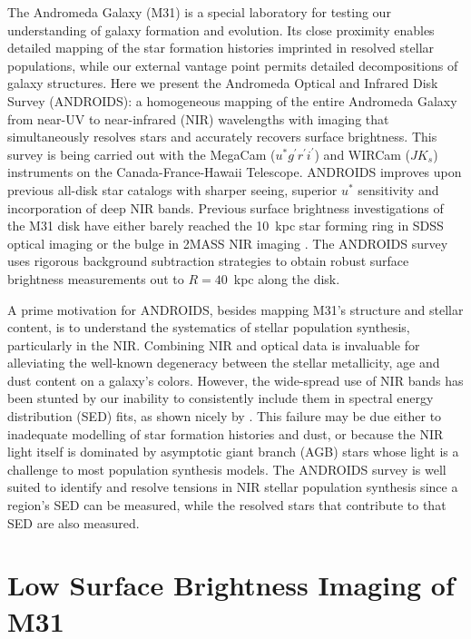 \documentclass[11pt,twoside]{article}
\begin{document}
The Andromeda Galaxy (M31) is a special laboratory for testing our understanding of galaxy formation and evolution.
Its close proximity enables detailed mapping of the star formation histories imprinted in resolved stellar populations, while our external vantage point permits detailed decompositions of galaxy structures.
Here we present the Andromeda Optical and Infrared Disk Survey (ANDROIDS): a homogeneous mapping of the entire Andromeda Galaxy from near-UV to near-infrared (NIR) wavelengths with imaging that simultaneously resolves stars and accurately recovers surface brightness.
This survey is being carried out with the MegaCam ($u^*g^\prime r^\prime i^\prime$) and WIRCam ($JK_s$) instruments on the Canada-France-Hawaii Telescope.
ANDROIDS improves upon previous all-disk star catalogs \citep[e.g., the Local Group Galaxy Survey;][]{Massey:2006} with sharper seeing, superior $u^*$ sensitivity and incorporation of deep NIR bands.
Previous surface brightness investigations of the M31 disk have either barely reached the 10~kpc star forming ring in SDSS optical imaging \citep{Tamm:2012} or the bulge in 2MASS NIR imaging \cite{Beaton:2007}.
The ANDROIDS survey uses rigorous background subtraction strategies to obtain robust surface brightness measurements out to $R=40$~kpc along the disk.

A prime motivation for ANDROIDS, besides mapping M31's structure and stellar content, is to understand the systematics of stellar population synthesis, particularly in the NIR.
Combining NIR and optical data is invaluable for alleviating the well-known degeneracy between the stellar metallicity, age and dust content on a galaxy's colors.
However, the wide-spread use of NIR bands has been stunted by our inability to consistently include them in spectral energy distribution (SED) fits, as shown nicely by \cite{Taylor:2011}.
This failure may be due either to inadequate modelling of star formation histories and dust, or because the NIR light itself is dominated by asymptotic giant branch (AGB) stars whose light is a challenge to most population synthesis models.
The ANDROIDS survey is well suited to identify and resolve tensions in NIR stellar population synthesis since a region's SED can be measured, while the resolved stars that contribute to that SED are also measured.

\section{Low Surface Brightness Imaging of M31}
\end{document}
